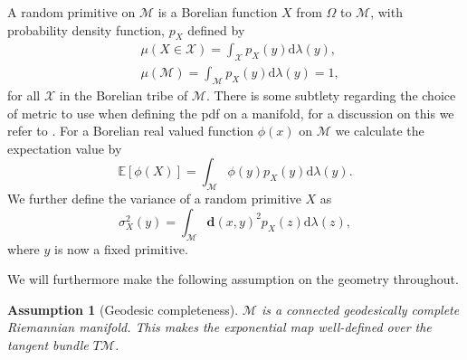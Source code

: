 \documentclass{article}
\newtheorem{assumption}{Assumption}
\newcommand{\CM}{\mathcal{M}}
\newcommand{\BN}{\mathbb{N}}
\newcommand{\rd}{\mathrm{d}}
\newcommand{\bd}{\mathbf{d}}
\begin{document}

A random primitive on $\CM$ is a Borelian function $X$ from $\Omega$ to $\CM$, with probability density function, $p_X$ defined by
\begin{equation}
    \begin{aligned}
        &\mu(X\in \mathcal{X})=\int_{\mathcal{X}}p_X(y)\rd\lambda(y),\\
        &\mu(\CM)=\int_{\CM}p_X(y)\rd\lambda(y)=1,
    \end{aligned}
\end{equation}
for all $\mathcal{X}$ in the Borelian tribe of $\CM$. There is some subtlety regarding the choice of metric to use when defining the pdf on a manifold, for a discussion on this we refer to \cite{pennec2004probabilities}. For a Borelian real valued function $\phi(x)$ on $\CM$ we calculate the expectation value by
\begin{equation}
    \mathbb{E}[\phi(X)]=\int_{\CM}\phi(y)p_X(y)\rd\lambda(y).
\end{equation}
We further define the variance of a random primitive $X$ as
\begin{equation}
    \sigma_X^2(y)=\int_{\CM} \bd(x,y)^2p_X(z)\rd\lambda(z),
\end{equation}
where $y$ is now a fixed primitive.


We will furthermore make the following assumption on the geometry throughout. 
\begin{assumption}[Geodesic completeness]\label{assum_geodesicComplete}
$\CM$ is a connected geodesically complete Riemannian manifold. This makes the exponential map well-defined over the tangent bundle $T\CM$. 
\end{assumption}
\end{document}
